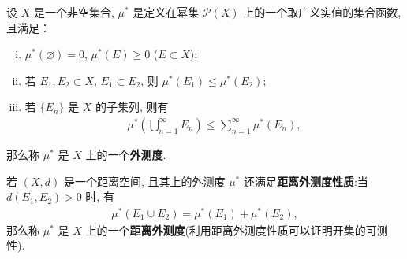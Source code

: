 \documentclass[../../main.tex]{subfiles}
\begin{document}
\begin{definition}[集合上的外测度]
设 \(X\) 是一个非空集合, \(\mu^*\) 是定义在幂集 \(\mathcal{P}(X)\) 上的一个取广义实值的集合函数, 且满足：
\begin{enumerate}[(i)]
\item \(\mu^*(\varnothing)=0\), \(\mu^*(E) \geq 0\) (\(E \subset X\));
\item 若 \(E_1, E_2 \subset X\), \(E_1 \subset E_2\), 则 \(\mu^*(E_1) \leq \mu^*(E_2)\);
\item 若 \(\{E_n\}\) 是 \(X\) 的子集列, 则有
\begin{align*}
\mu^*\left( \bigcup_{n = 1}^{\infty} E_n \right) \leq \sum_{n = 1}^{\infty} \mu^*(E_n),
\end{align*}
\end{enumerate}
那么称 \(\mu^*\) 是 \(X\) 上的一个\textbf{外测度}.

若 \((X, d)\) 是一个距离空间, 且其上的外测度 \(\mu^*\) 还满足\textbf{距离外测度性质}:当 \(d(E_1, E_2)>0\) 时, 有
\begin{align*}
\mu^*(E_1 \cup E_2) = \mu^*(E_1) + \mu^*(E_2),
\end{align*}
那么称 \(\mu^*\) 是 \(X\) 上的一个\textbf{距离外测度}(利用距离外测度性质可以证明开集的可测性). 
\end{definition}
\end{document}
